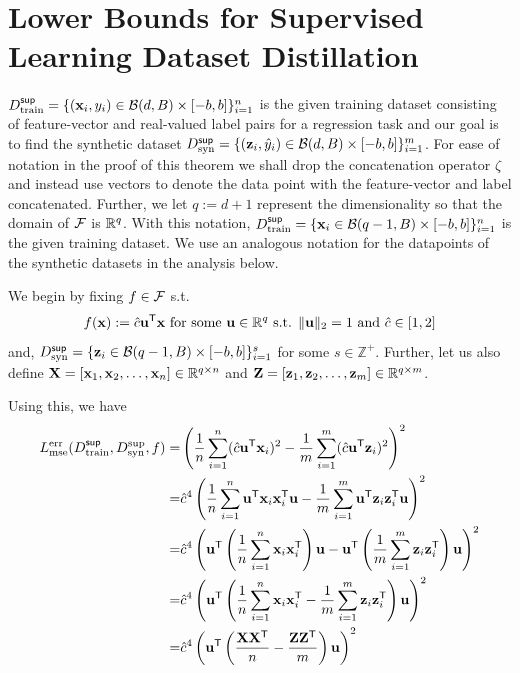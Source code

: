 \section{Lower Bounds for Supervised Learning Dataset Distillation}
\label{sec:lowerbounds}
$D^{\sf sup}_{\textnormal{train}} = \{({\mathbf{x}}_i, y_i) \in \mathcal{B}(d, B) \times [-b, b]\}_{i=1}^n$ is the given training dataset consisting of feature-vector and real-valued label pairs for a regression task and our goal is to find the synthetic dataset $D^{\sf sup}_{\textnormal{syn}} = \{({\mathbf{z}}_i, \hat{y}_i)\in \mathcal{B}(d,B) \times [-b,b]\}_{i=1}^m$. 
 For ease of notation in the proof of this theorem we shall drop the concatenation operator $\zeta$ and instead use vectors to denote the data point with the feature-vector and label concatenated. Further, we let $q := d+1$ represent the dimensionality so that the domain of $\mathcal{F}$ is $\mathbb{R}^q$. With this notation,  $D^{\sf sup}_{\textnormal{train}} = \{{\mathbf{x}}_i \in \mathcal{B}(q-1,B)\times [-b,b]\}_{i=1}^n$ is the given training dataset. We use an analogous notation for the datapoints of the synthetic datasets in the analysis below.

We begin by fixing $f \in \mathcal{F}$ s.t. 
\begin{equation}
    f({\mathbf{x}}) := \hat{c}{\mathbf{u}}^{\sf T}{\mathbf{x}} \textnormal{ for some } {\mathbf{u}} \in \mathbb{R}^q \textnormal{ s.t. } \|{\mathbf{u}}\|_2 = 1 \textnormal{ and } \hat{c} \in [1,2] \nonumber
\end{equation}
and, $D^{\sf sup}_{\textnormal{syn}} = \{{{\mathbf{z}}}_i \in \mathcal{B}(q-1, B) \times [-b, b]\}_{i=1}^s$ for some $s \in \mathbb{Z}^+$. Further, let us also define ${\mathbf{X}} = [{\mathbf{x}}_1, {\mathbf{x}}_2 , \dots, {\mathbf{x}}_n] \in \mathbb{R}^{q\times n}$ and ${\mathbf{Z}} = [{\mathbf{z}}_1, {\mathbf{z}}_2 , \dots, {\mathbf{z}}_m] \in \mathbb{R}^{q \times m}$. 

Using this, we have
\begin{align}
    L^{\textnormal{err}}_{\textnormal{mse}}(D^{\sf sup}_{\textnormal{train}},  D_{\textnormal{syn}}^{\textnormal{sup}}, f) =& \left(\frac{1}{n}\sum_{i=1}^n(\hat{c}{\mathbf{u}}^{\sf T}{\mathbf{x}}_i)^2-\frac{1}{m}\sum_{i=1}^m(\hat{c}{\mathbf{u}}^{\sf T}{{\mathbf{z}}}_i)^2\right)^2  \nonumber \\
    =& \hat{c}^4\left(\frac{1}{n}\sum_{i=1}^n{\mathbf{u}}^{\sf T}{\mathbf{x}}_i {\mathbf{x}}_i^{\sf T} {\mathbf{u}} -\frac{1}{m}\sum_{i=1}^m{\mathbf{u}}^{\sf T}{{\mathbf{z}}}_i{{\mathbf{z}}}_i^{\sf T}{\mathbf{u}}\right)^2 \nonumber \\
    =& \hat{c}^4\left({\mathbf{u}}^{\sf T}\left(\frac{1}{n}\sum_{i=1}^n{\mathbf{x}}_i {\mathbf{x}}_i^{\sf T}\right) {\mathbf{u}} -{\mathbf{u}}^{\sf T}\left(\frac{1}{m}\sum_{i=1}^m{{\mathbf{z}}}_i{{\mathbf{z}}}_i^{\sf T}\right){\mathbf{u}}\right)^2 \nonumber \\
    =& \hat{c}^4\left({\mathbf{u}}^{\sf T}\left(\frac{1}{n}\sum_{i=1}^n{\mathbf{x}}_i {\mathbf{x}}_i^{\sf T}-\frac{1}{m}\sum_{i=1}^m{{\mathbf{z}}}_i{{\mathbf{z}}}_i^{\sf T}\right){\mathbf{u}}\right)^2 \nonumber \\
    =& \hat{c}^4\left({\mathbf{u}}^{\sf T}\left(\frac{{\mathbf{X}}{\mathbf{X}}^{\sf T}}{n}-\frac{{\mathbf{Z}}{\mathbf{Z}}^{\sf T}}{m}\right){\mathbf{u}}\right)^2 \label{eqn:vecform}
\end{align}

